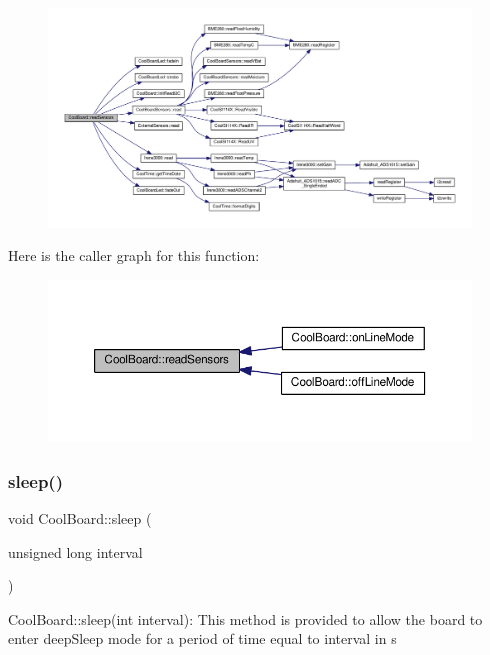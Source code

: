 \begin{figure}[H]
\begin{center}
\leavevmode
\includegraphics[width=350pt]{d7/df9/class_cool_board_ad03abdce2e65f520bbf2cff0f2d083cf_cgraph}
\end{center}
\end{figure}
Here is the caller graph for this function\+:
\nopagebreak
\begin{figure}[H]
\begin{center}
\leavevmode
\includegraphics[width=350pt]{d7/df9/class_cool_board_ad03abdce2e65f520bbf2cff0f2d083cf_icgraph}
\end{center}
\end{figure}
\mbox{\label{class_cool_board_a069952cdcb2e7f68518aa429eceadb6e}} 
\subsubsection{\texorpdfstring{sleep()}{sleep()}}
{\footnotesize\ttfamily void Cool\+Board\+::sleep (\begin{DoxyParamCaption}\item[{unsigned long}]{interval }\end{DoxyParamCaption})}

Cool\+Board\+::sleep(int interval)\+: This method is provided to allow the board to enter deep\+Sleep mode for a period of time equal to interval in s 

